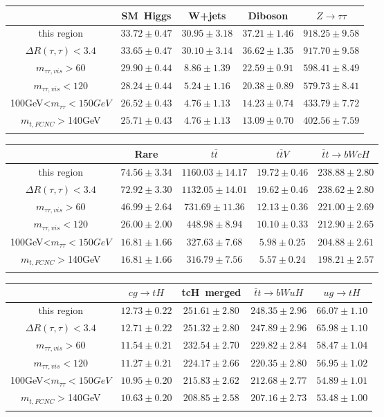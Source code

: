 \centering
\begin{tabular}{ccccc} \toprule\toprule
 & SM~Higgs & W+jets & Diboson & $Z\to \tau\tau$\\\midrule
this region & $33.72\pm0.47$ & $30.95\pm3.18$ & $37.21\pm1.46$ & $918.25\pm9.58$\\
$\Delta R(\tau,\tau)<3.4$ & $33.65\pm0.47$ & $30.10\pm3.14$ & $36.62\pm1.35$ & $917.70\pm9.58$\\
$m_{\tau\tau,vis}>60$ & $29.90\pm0.44$ & $8.86\pm1.39$ & $22.59\pm0.91$ & $598.41\pm8.49$\\
$m_{\tau\tau,vis}<120$ & $28.24\pm0.44$ & $5.24\pm1.16$ & $20.38\pm0.89$ & $579.73\pm8.41$\\
100GeV<$m_{\tau\tau}<150GeV$ & $26.52\pm0.43$ & $4.76\pm1.13$ & $14.23\pm0.74$ & $433.79\pm7.72$\\
$m_{t,FCNC}>$140GeV & $25.71\pm0.43$ & $4.76\pm1.13$ & $13.09\pm0.70$ & $402.56\pm7.59$\\
\bottomrule\bottomrule\\
\end{tabular}
\begin{tabular}{ccccc} \toprule\toprule
 & Rare & $t\bar{t}$ & $t\bar{t}V$ & $\bar{t}t\to bWcH$\\\midrule
this region & $74.56\pm3.34$ & $1160.03\pm14.17$ & $19.72\pm0.46$ & $238.88\pm2.80$\\
$\Delta R(\tau,\tau)<3.4$ & $72.92\pm3.30$ & $1132.05\pm14.01$ & $19.62\pm0.46$ & $238.62\pm2.80$\\
$m_{\tau\tau,vis}>60$ & $46.99\pm2.64$ & $731.69\pm11.36$ & $12.13\pm0.36$ & $221.00\pm2.69$\\
$m_{\tau\tau,vis}<120$ & $26.00\pm2.00$ & $448.98\pm8.94$ & $10.10\pm0.33$ & $212.90\pm2.65$\\
100GeV<$m_{\tau\tau}<150GeV$ & $16.81\pm1.66$ & $327.63\pm7.68$ & $5.98\pm0.25$ & $204.88\pm2.61$\\
$m_{t,FCNC}>$140GeV & $16.81\pm1.66$ & $316.79\pm7.56$ & $5.57\pm0.24$ & $198.21\pm2.57$\\
\bottomrule\bottomrule\\
\end{tabular}
\begin{tabular}{ccccc} \toprule\toprule
 & $cg\to tH$ & tcH~merged & $\bar{t}t\to bWuH$ & $ug\to tH$\\\midrule
this region & $12.73\pm0.22$ & $251.61\pm2.80$ & $248.35\pm2.96$ & $66.07\pm1.10$\\
$\Delta R(\tau,\tau)<3.4$ & $12.71\pm0.22$ & $251.32\pm2.80$ & $247.89\pm2.96$ & $65.98\pm1.10$\\
$m_{\tau\tau,vis}>60$ & $11.54\pm0.21$ & $232.54\pm2.70$ & $229.82\pm2.84$ & $58.47\pm1.04$\\
$m_{\tau\tau,vis}<120$ & $11.27\pm0.21$ & $224.17\pm2.66$ & $220.35\pm2.80$ & $56.95\pm1.02$\\
100GeV<$m_{\tau\tau}<150GeV$ & $10.95\pm0.20$ & $215.83\pm2.62$ & $212.68\pm2.77$ & $54.89\pm1.01$\\
$m_{t,FCNC}>$140GeV & $10.63\pm0.20$ & $208.85\pm2.58$ & $207.16\pm2.73$ & $53.48\pm1.00$\\
\bottomrule\bottomrule\\
\end{tabular}
